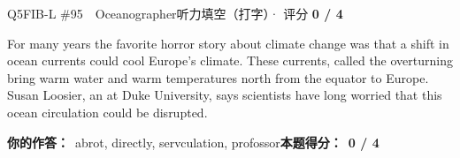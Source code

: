 \begin{qblock}{Q5\quad FIB-L \#95\ \ Oceanographer}{听力填空（打字）· 评分 \textcolor{cAccent}{\bfseries 0 / 4}}
\begin{promptbox}
For many years the favorite horror story about  climate change was that a shift in ocean currents could  cool Europe's climate. These currents, called the overturning  bring warm water and warm temperatures north from the equator to Europe. Susan Loosier, an  at Duke University, says scientists have long worried that this ocean circulation could be disrupted.
\end{promptbox}
\par\smallskip
\textbf{你的作答：}\ {\color{cWrong}abrot, directly, servculation, profossor}\qquad\textbf{本题得分：}\ {\color{cAccent}\bfseries 0 / 4}
\end{qblock}

